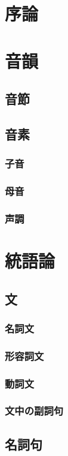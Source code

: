 \section{序論}
\newpage

\section{音韻}
\subsection{音節}
\subsection{音素}
\subsubsection{子音}
\subsubsection{母音}
\subsubsection{声調}
\newpage

\section{統語論}
\subsection{文}
\subsubsection{名詞文}
\subsubsection{形容詞文}
\subsubsection{動詞文}
\subsubsection{文中の副詞句}
\subsection{名詞句}
